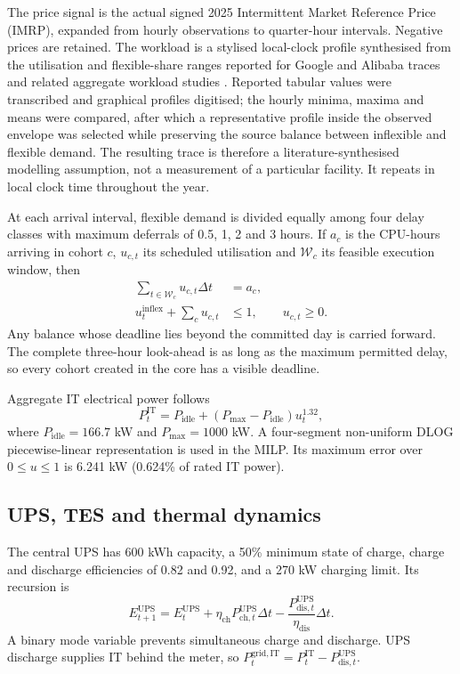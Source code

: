The price signal is the actual signed 2025 Intermittent Market Reference Price
(IMRP), expanded from hourly observations to quarter-hour intervals. Negative
prices are retained. The workload is a stylised local-clock profile synthesised
from the utilisation and flexible-share ranges reported for Google and Alibaba
traces and related aggregate workload studies
\cite{6779441,Cao2022ApEn,Misaghian2023TIA,Xu2023SPIE,Fu2020ApEn,Liu2012PER}.
Reported tabular values were transcribed and graphical profiles digitised; the
hourly minima, maxima and means were compared, after which a representative
profile inside the observed envelope was selected while preserving the source
balance between inflexible and flexible demand. The resulting trace is
therefore a literature-synthesised modelling assumption, not a measurement of
a particular facility. It repeats in local clock time throughout the year.

At each arrival interval, flexible demand is divided equally among four delay
classes with maximum deferrals of 0.5, 1, 2 and 3 hours. If $a_c$ is the
CPU-hours arriving in cohort $c$, $u_{c,t}$ its scheduled utilisation and
$\mathcal W_c$ its feasible execution window, then
\begin{align}
 \sum_{t\in\mathcal W_c}u_{c,t}\Delta t &= a_c,\\
 u_t^{\mathrm{inflex}}+\sum_c u_{c,t} &\leq 1,
 \qquad u_{c,t}\geq0. \label{eq:workload}
\end{align}
Any balance whose deadline lies beyond the committed day is carried forward.
The complete three-hour look-ahead is as long as the maximum permitted delay,
so every cohort created in the core has a visible deadline.

Aggregate IT electrical power follows
\begin{equation}
 P_t^{\mathrm{IT}}=P_{\mathrm{idle}}+
 (P_{\max}-P_{\mathrm{idle}})u_t^{1.32},
 \label{eq:it-power}
\end{equation}
where $P_{\mathrm{idle}}=166.7$ kW and $P_{\max}=1000$ kW. A four-segment
non-uniform DLOG piecewise-linear representation is used in the MILP. Its
maximum error over $0\leq u\leq1$ is 6.241 kW (0.624\% of rated IT power).

\subsection{UPS, TES and thermal dynamics}

The central UPS has 600 kWh capacity, a 50\% minimum state of charge, charge
and discharge efficiencies of 0.82 and 0.92, and a 270 kW charging limit. Its
recursion is
\begin{equation}
 E^{\mathrm{UPS}}_{t+1}=E^{\mathrm{UPS}}_t+
 \eta_{\mathrm{ch}}P^{\mathrm{UPS}}_{\mathrm{ch},t}\Delta t-
 \frac{P^{\mathrm{UPS}}_{\mathrm{dis},t}}{\eta_{\mathrm{dis}}}\Delta t.
 \label{eq:ups}
\end{equation}
A binary mode variable prevents simultaneous charge and discharge. UPS
discharge supplies IT behind the meter, so
$P^{\mathrm{grid,IT}}_t=P^{\mathrm{IT}}_t-P^{\mathrm{UPS}}_{\mathrm{dis},t}$.

